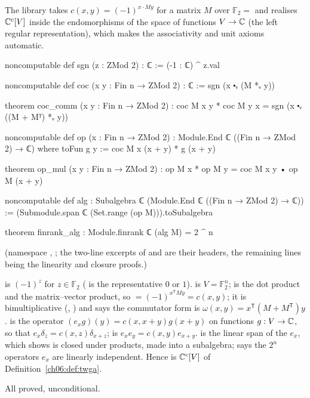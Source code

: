 The library takes $c(x,y)=(-1)^{x\cdot My}$ for a matrix $M$ over $\mathbb F_2=$  and
realises ${\mathbb{C}}^c[V]$ inside the endomorphisms of the space of functions $V\to{\mathbb{C}}$ (the left regular
representation), which makes the associativity and unit axioms automatic.

\begin{leancode}
noncomputable def sgn (z : ZMod 2) : ℂ := (-1 : ℂ) ^ z.val
\end{leancode}
\begin{leancode}
noncomputable def coc (x y : Fin n → ZMod 2) : ℂ := sgn (x ⬝ᵥ (M *ᵥ y))
\end{leancode}
\begin{leancode}
theorem coc_comm (x y : Fin n → ZMod 2) :
    coc M x y * coc M y x = sgn (x ⬝ᵥ ((M + Mᵀ) *ᵥ y))
\end{leancode}
\begin{leancode}
noncomputable def op (x : Fin n → ZMod 2) : Module.End ℂ ((Fin n → ZMod 2) → ℂ) where
  toFun g y := coc M x (x + y) * g (x + y)
\end{leancode}
\begin{leancode}
theorem op_mul (x y : Fin n → ZMod 2) : op M x * op M y = coc M x y • op M (x + y)
\end{leancode}
\begin{leancode}
noncomputable def alg : Subalgebra ℂ (Module.End ℂ ((Fin n → ZMod 2) → ℂ)) :=
  (Submodule.span ℂ (Set.range (op M))).toSubalgebra
\end{leancode}
\begin{leancode}
theorem finrank_alg : Module.finrank ℂ (alg M) = 2 ^ n
\end{leancode}
(namespace , ; the
two-line excerpts of  and  are their headers, the remaining lines being the
linearity and closure proofs.)
\begin{dictionary}
 is $(-1)^z$ for $z\in\mathbb F_2$ ( is the representative $0$ or $1$).
 is $V=\mathbb F_2^n$;  is the dot product and
 the matrix--vector product, so  $=(-1)^{x^{\mathsf T}My}=c(x,y)$; it
is bimultiplicative (, ) and  says the
commutator form is $\omega(x,y)=x^{\mathsf T}(M+M^{\mathsf T})y$.   is the operator
$(e_x g)(y)=c(x,x+y)g(x+y)$ on functions $g:V\to{\mathbb{C}}$, so that $e_x\delta_z=c(x,z)\delta_{x+z}$;
 is $e_xe_y=c(x,y)e_{x+y}$.   is the linear span of the $e_x$, which
 shows is closed under products, made into a subalgebra;  says the
$2^n$ operators $e_x$ are linearly independent.  Hence  is ${\mathbb{C}}^c[V]$ of
Definition~\ref{ch06:def:twga}.
\end{dictionary}
\begin{status}
All proved, unconditional.
\end{status}

